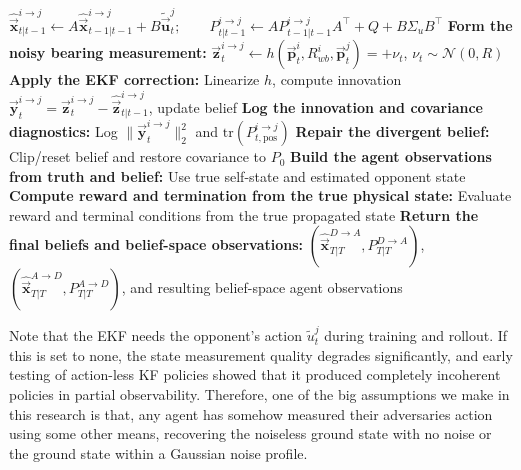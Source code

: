 \begin{algorithm}[H]
\begin{algorithmic}[1]
 \State \hspace{1em} $\hat{\vec{\mathbf{x}}}_{t|t-1}^{i\to j}\leftarrow A\hat{\vec{\mathbf{x}}}_{t-1|t-1}^{i\to j}+B\tilde{\vec{\mathbf{u}}}_t^j;\qquad
P_{t|t-1}^{i\to j}\leftarrow A P_{t-1|t-1}^{i\to j} A^\top + Q + B\Sigma_u B^\top$
      \State \textbf{Form the noisy bearing measurement:}
      \State \hspace{1em} $\vec{\mathbf{z}}^{i \to j}_t\leftarrow h(\vec{\mathbf{p}}_t^i, R_{wb}^i, \vec{\mathbf{p}}_t^j)=+\nu_t$, $\nu_t\sim\mathcal{N}(0,R)$
      \State \textbf{Apply the EKF correction:}
      \State \hspace{1em} Linearize $h$, compute innovation $\vec{\mathbf{y}}^{i \to j}_t = \vec{\mathbf{z}}^{i \to j}_t - \hat{\vec{\mathbf{z}}}^{i \to j}_{t|t-1}$, update  belief
      \State \textbf{Log the innovation and covariance diagnostics:}
      \State \hspace{1em} Log $\|\vec{\mathbf{y}}_t^{i\to j}\|_2^2$ and $\mathrm{tr}(P^{i\to j}_{t,\mathrm{pos}})$
    \EndIf
      \State \textbf{Repair the divergent belief:}
      \State \hspace{1em} Clip/reset belief and restore covariance to $P_0$
    \EndIf
  \EndFor
  \State \textbf{Build the agent observations from truth and belief:}
  \State \hspace{1em} Use true self-state and estimated opponent state
  \State \textbf{Compute reward and termination from the true physical state:}
  \State \hspace{1em} Evaluate reward and terminal conditions from the true propagated state
\EndFor
\State \textbf{Return the final beliefs and belief-space observations:}
\State \hspace{1em} $(\hat{\vec{\mathbf{x}}}^{D\to A}_{T|T},P^{D\to A}_{T|T})$, $(\hat{\vec{\mathbf{x}}}^{A\to D}_{T|T},P^{A\to D}_{T|T})$, and resulting belief-space agent observations
\end{algorithmic}
\end{algorithm}


Note that the EKF needs the opponent's action $\tilde{u}_t^j$ during training and rollout. If this is set to none, the state measurement quality degrades significantly, and early testing of action-less KF policies showed that it produced completely incoherent policies in partial observability. Therefore, one of the big assumptions we make in this research is that, any agent has somehow measured their adversaries action using some other means, recovering the noiseless ground state with no noise or the ground state within a Gaussian noise profile.

